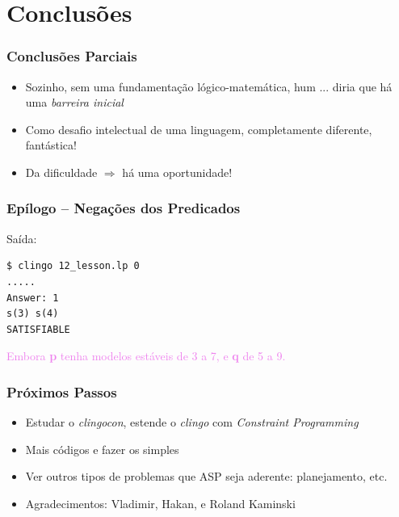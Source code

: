 \documentclass{beamer}
\begin{document}
\section{Conclusões}

\begin{frame}
	\frametitle{Conclusões Parciais}
	
		
\begin{block}{}
	
	\begin{itemize}
		\item Sozinho, sem uma fundamentação lógico-matemática, hum ... diria que há uma \emph{barreira inicial}
		\pause
		
		\item Como desafio intelectual de uma linguagem,
		completamente diferente, fantástica!
		\pause
		
		\item Da dificuldade $\Rightarrow$ há uma oportunidade!
		
		
	\end{itemize}
\end{block}

\end{frame}




\begin{frame} [fragile]
	\frametitle{Epílogo -- Negações dos Predicados}


	

Saída:
\pause
{\small
\begin{verbatim}
$ clingo 12_lesson.lp 0
.....
Answer: 1
s(3) s(4)
SATISFIABLE
\end{verbatim}
}	

\textcolor{violet}{Embora \textbf{p} tenha modelos estáveis de 3 a 7, e  \textbf{q}  de 5 a 9.}


\end{frame}


\begin{frame} 
	\frametitle{Próximos Passos}
	
\begin{block}{}
	
	\begin{itemize}
		\item Estudar o \emph{clingocon}, estende o \emph{clingo} com \emph{Constraint Programming}

		\item Mais códigos e fazer os simples
		\item Ver outros tipos de problemas que ASP seja aderente: planejamento, etc.
		
		\item Agradecimentos: Vladimir,  Hakan, 	e	Roland Kaminski
		
	\end{itemize}
\end{block}
\end{frame}
\end{document}
